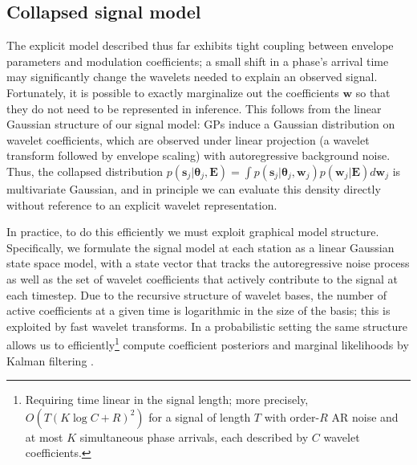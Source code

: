 \documentclass[twoside]{article} \usepackage{aistats2017}
\renewcommand{\v}[1]{\mathbf{#1}}
\begin{document}

\subsection{Collapsed signal model}

The explicit model described thus far exhibits tight coupling between
envelope parameters and modulation coefficients; a small shift in a
phase's arrival time may significantly change the wavelets needed to
explain an observed signal. Fortunately, it is possible to exactly
marginalize out the coefficients $\v{w}$ so that they do not need to
be represented in inference. This follows from the linear Gaussian
structure of our signal model: GPs induce a Gaussian distribution on
wavelet coefficients, which are observed under linear projection (a
wavelet transform followed by envelope scaling) with autoregressive
background noise. Thus, the collapsed distribution
$p(\v{s}_j | \v{\theta}_j, \v{E}) = \int p(\v{s}_j | \v{\theta}_j, \v{w}_j)
p(\v{w}_j | \v{E}) d\v{w}_j$
is multivariate Gaussian, and in principle we can evaluate this density
directly without reference to an explicit wavelet representation.

In practice, to do this efficiently we must exploit graphical model
structure. Specifically, we formulate the signal model at each station 
as a linear Gaussian state space model, with a state vector
that tracks the autoregressive noise process as well as the set of
wavelet coefficients that actively contribute to the signal at each
timestep.  Due to the recursive structure of wavelet bases, the number
of active coefficients at a given time is logarithmic in the size of
the basis; this is exploited by fast wavelet transforms. In a
probabilistic setting the same structure allows us to efficiently\footnote{Requiring time linear in the signal length; more precisely,
  $O(T (K \log C + R)^2 )$ for a signal of length $T$ with order-$R$
  AR noise and at most $K$ simultaneous phase arrivals, each described
  by $C$ wavelet coefficients.} compute coefficient posteriors and
marginal likelihoods by Kalman filtering
\citep{kalmanref}. 
\end{document}
